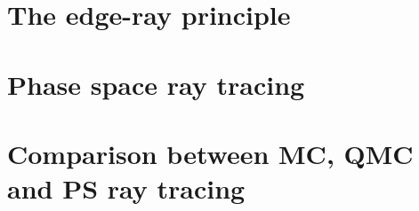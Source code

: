 %
\section{The edge-ray principle}


\section{Phase space ray tracing}

\section{Comparison between MC, QMC and PS ray tracing}